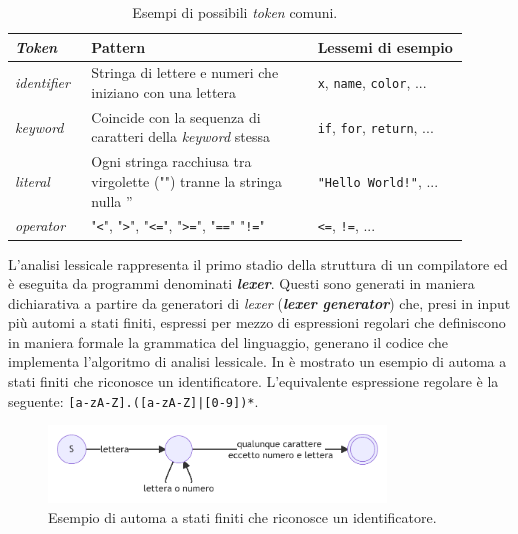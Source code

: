 \begin{table}[h]
    \centering
    \begin{tabular}{|p{0.15\linewidth}|p{0.45\linewidth}|p{0.3\linewidth}|}
        \hline
        \textbf{\textit{Token}} & \textbf{Pattern} & \textbf{Lessemi di esempio} \\ [0.5ex] 
        \hline\hline
        \textit{identifier} & Stringa di lettere e numeri che iniziano con una lettera & \texttt{x}, \texttt{name}, \texttt{color}, ... \\ 
        \hline
        \textit{keyword} & Coincide con la sequenza di caratteri della \textit{keyword} stessa & \texttt{if}, \texttt{for}, \texttt{return}, ... \\
        \hline
        \textit{literal} & Ogni stringa racchiusa tra virgolette ("") tranne la stringa nulla '' & \texttt{"Hello World!"}, ... \\
        \hline
        \textit{operator} & "\texttt{<}", "\texttt{>}", "\texttt{<=}", "\texttt{>=}", "\texttt{==}" "\texttt{!=}" & \texttt{<=}, \texttt{!=}, ... \\
        \hline
    \end{tabular}
    \caption{Esempi di possibili \textit{token} comuni.}
    \label{table:token-examples}
\end{table}

L'analisi lessicale rappresenta il primo stadio della struttura di un compilatore ed è eseguita da programmi denominati \textbf{\textit{lexer}}. 
%
Questi sono generati in maniera dichiarativa a partire da generatori di \textit{lexer} (\textbf{\textit{lexer generator}}) che, presi in input più automi a stati finiti, espressi per mezzo di espressioni regolari che definiscono in maniera formale la grammatica del linguaggio, generano il codice che implementa l'algoritmo di analisi lessicale. 
%
In  è mostrato un esempio di automa a stati finiti che riconosce un identificatore.
%
L'equivalente espressione regolare è la seguente: \texttt{[a-zA-Z].([a-zA-Z]|[0-9])*}.

\begin{figure}[h]
    \centering
    \includegraphics[width=0.8\textwidth]{resources/img/01-id-finite-automa.pdf}
    \caption{Esempio di automa a stati finiti che riconosce un identificatore.}
    \label{img:01-id-finite-automa}
\end{figure}

